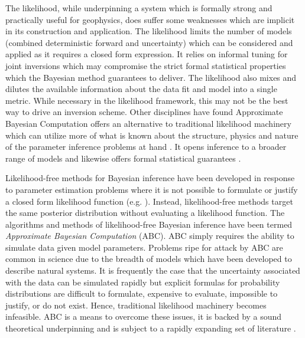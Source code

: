 The likelihood, while underpinning a system which is formally strong and practically useful for geophysics, does suffer some weaknesses which are implicit in its construction and application. The likelihood limits the number of models (combined deterministic forward and uncertainty) which can be considered and applied as it requires a closed form expression. It relies on informal tuning for joint inversions which may compromise the strict formal statistical properties which the Bayesian method guarantees to deliver. The likelihood also mixes and dilutes the available information about the data fit and model into a single metric. While necessary in the likelihood framework, this may not be the best way to drive an inversion scheme. Other disciplines have found Approximate Bayesian Computation offers an alternative to traditional likelihood machinery which can utilize more of what is known about the structure, physics and nature of the parameter inference problems at hand \citep{Tavare1997,Ratmann2009,vrugt2013toward}. It opens inference to a broader range of models and likewise offers formal statistical guarantees \citep{Sunnaker2013}.\par

Likelihood-free methods for Bayesian inference have been developed in response to parameter estimation problems where it is not possible to formulate or justify a closed form likelihood function (e.g. \citet{Tavare1997,Fu1997,Weiss1998a,Pritchard1999a,Beaumont2002,Marjoram2003}). Instead, likelihood-free methods target the same posterior distribution without evaluating a likelihood function. The algorithms and methods of likelihood-free Bayesian inference have been termed \textit{Approximate Bayesian Computation} (ABC). ABC simply requires the ability to simulate data given model parameters. Problems ripe for attack by ABC are common in science due to the breadth of models which have been developed to describe natural systems. It is frequently the case that the uncertainty associated with the data can be simulated rapidly but explicit formulas for probability distributions are difficult to formulate, expensive to evaluate, impossible to justify, or do not exist. Hence, traditional likelihood machinery becomes infeasible. ABC is a means to overcome these issues, it is backed by a sound theoretical underpinning and is subject to a rapidly expanding set of literature \citep{Ratmann2009,Blum2010,vrugt2013toward,Sunnaker2013,Blum2013,Sadegh2014,Pudlo2015,meeds2015hamiltonian,Lintusaari2016,gutmann2016bayesian,sisson2016handbook,Li2017}. \par

